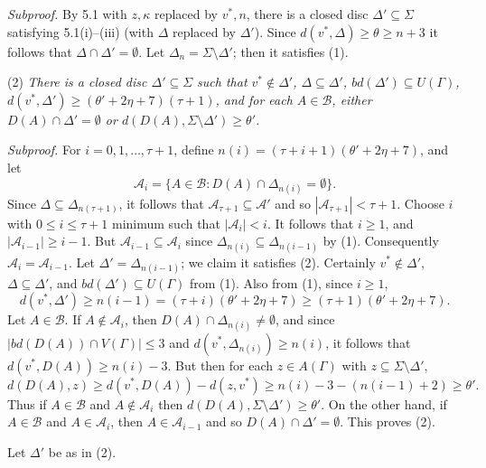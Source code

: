 \textit{Subproof.} By 5.1 with $z, \kappa$ replaced by $v^*, n$, there is a closed disc $\Delta' \subseteq \Sigma$ satisfying 5.1(i)--(iii) (with $\Delta$ replaced by $\Delta'$). Since $d(v^*, \Delta) \ge \theta \ge n + 3$ it follows that $\Delta \cap \Delta' = \emptyset$. Let $\Delta_n = \Sigma \setminus \Delta'$; then it satisfies (1).

\hspace*{12pt}(2) \textit{There is a closed disc $\Delta' \subseteq \Sigma$ such that $v^* \notin \Delta'$, $\Delta \subseteq \Delta'$, $bd(\Delta') \subseteq U(\Gamma)$, $d(v^*, \Delta') \ge (\theta' + 2\eta + 7)(\tau + 1)$, and for each $A \in \mathcal{B}$, either $D(A) \cap \Delta' = \emptyset$ or $d(D(A), \Sigma \setminus \Delta') \ge \theta'$.}

\textit{Subproof.} For $i = 0, 1, \dots, \tau + 1$, define $n(i) = (\tau + i + 1)(\theta' + 2\eta + 7)$, and let
\begin{equation*}
\mathcal{A}_i = \{A \in \mathcal{B} : D(A) \cap \Delta_{n(i)} = \emptyset\}.
\end{equation*}
Since $\Delta \subseteq \Delta_{n(\tau+1)}$, it follows that $\mathcal{A}_{\tau+1} \subseteq \mathcal{A}'$ and so $|\mathcal{A}_{\tau+1}| < \tau + 1$. Choose $i$ with $0 \le i \le \tau + 1$ minimum such that $|\mathcal{A}_i| < i$. It follows that $i \ge 1$, and $|\mathcal{A}_{i-1}| \ge i - 1$. But $\mathcal{A}_{i-1} \subseteq \mathcal{A}_i$ since $\Delta_{n(i)} \subseteq \Delta_{n(i - 1)}$ by (1). Consequently $\mathcal{A}_i = \mathcal{A}_{i-1}$. Let $\Delta' = \Delta_{n(i - 1)}$; we claim it satisfies (2). Certainly $v^* \notin \Delta'$, $\Delta \subseteq \Delta'$, and $bd(\Delta') \subseteq U(\Gamma)$ from (1). Also from (1), since $i \ge 1$,
\begin{equation*}
d(v^*, \Delta') \ge n(i - 1) = (\tau + i)(\theta' + 2\eta + 7) \ge (\tau + 1)(\theta' + 2\eta + 7).
\end{equation*}
Let $A \in \mathcal{B}$. If $A \notin \mathcal{A}_i$, then $D(A) \cap \Delta_{n(i)} \ne \emptyset$, and since $|bd(D(A)) \cap V(\Gamma)| \le 3$ and $d(v^*, \Delta_{n(i)}) \ge n(i)$, it follows that $d(v^*, D(A)) \ge n(i) - 3$. But then for each $z \in A(\Gamma)$ with $z \subseteq \Sigma \setminus \Delta'$,
\begin{equation*}
d(D(A), z) \ge d(v^*, D(A)) - d(z, v^*) \ge n(i) - 3 - (n(i - 1) + 2) \ge \theta'.
\end{equation*}
Thus if $A \in \mathcal{B}$ and $A \notin \mathcal{A}_i$ then $d(D(A), \Sigma \setminus \Delta') \ge \theta'$. On the other hand, if $A \in \mathcal{B}$ and $A \in \mathcal{A}_i$, then $A \in \mathcal{A}_{i-1}$ and so $D(A) \cap \Delta' = \emptyset$. This proves (2).

Let $\Delta'$ be as in (2).
